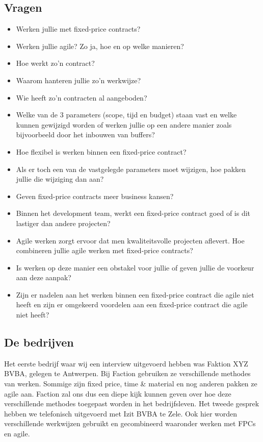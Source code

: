 \documentclass{hogent-article}
\begin{document}
	\subsection{Vragen}
	\begin{itemize}
		\item Werken jullie met fixed-price contracts?
		\item Werken jullie agile? Zo ja, hoe en op welke manieren?
		\item Hoe werkt zo'n contract?
		\item Waarom hanteren jullie zo’n werkwijze?
		\item Wie heeft zo'n contracten al aangeboden?
		\item Welke van de 3 parameters (scope, tijd en budget) staan vast en welke kunnen gewijzigd worden of werken jullie op een andere manier zoals bijvoorbeeld door het inbouwen van buffers?
		\item Hoe flexibel is werken binnen een fixed-price contract?
		\item Als er toch een van de vastgelegde parameters moet wijzigen, hoe pakken jullie die wijziging dan aan?
		\item Geven fixed-price contracts meer business kansen?
		\item Binnen het development team, werkt een fixed-price contract goed of is dit lastiger dan andere projecten?
		\item Agile werken zorgt ervoor dat men kwaliteitsvolle projecten aflevert. Hoe combineren jullie agile werken met fixed-price contracts?
		\item Is werken op deze manier een obstakel voor jullie of geven jullie de voorkeur aan deze aanpak?
		\item Zijn er nadelen aan het werken binnen een fixed-price contract die agile niet heeft en zijn er omgekeerd voordelen aan een fixed-price contract die agile niet heeft?
	\end{itemize}
		
    \subsection{De bedrijven}
    Het eerste bedrijf waar wij een interview uitgevoerd hebben was Faktion XYZ BVBA, gelegen te Antwerpen. Bij Faction gebruiken ze verschillende methodes van werken. Sommige zijn fixed price, time \& material en nog anderen pakken ze agile aan. Faction zal ons dus een diepe kijk kunnen geven over hoe deze verschillende methodes toegepast worden in het bedrijfsleven.
    \linebreak
    \linebreak
    Het tweede gesprek hebben we telefonisch uitgevoerd met Izit BVBA te Zele. Ook hier worden verschillende werkwijzen gebruikt en gecombineerd waaronder werken met FPCs en agile.
    
\end{document}
